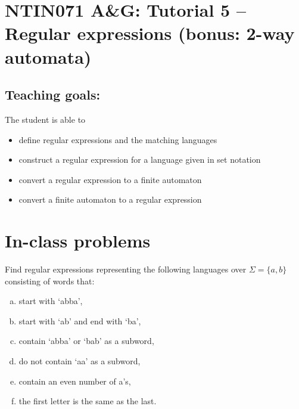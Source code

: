 \documentclass[a4paper,12pt]{amsart}
\begin{document}
\thispagestyle{empty}

\section*{NTIN071 A\&G: Tutorial 5 -- Regular expressions (bonus: 2-way automata)}

\medskip

\subsection*{Teaching goals:} The student is able to

    \begin{itemize}\setlength{\itemsep}{0pt}
        \item define regular expressions and the matching languages
        \item construct a regular expression for a language given in set notation
        \item convert a regular expression to a finite automaton
        \item convert a finite automaton to a regular expression
    \end{itemize}

\medskip

\section*{In-class problems}


\medskip\begin{problem}

    Find regular expressions representing the following languages over $\Sigma = \{a, b\}$ consisting of words that:

    \begin{multicols}{2}

        \begin{enumerate}[(a)]\setlength\itemsep{0pt}
            \item start with `abba',
            \item start with `ab' and end with `ba',
            \item contain `abba' or `bab' as a subword,
            \item do not contain `aa' as a subword,
            \item contain an even number of a's,
            \item the first letter is the same as the last.
        \end{enumerate}

    \end{multicols}

\end{problem}
\end{document}
